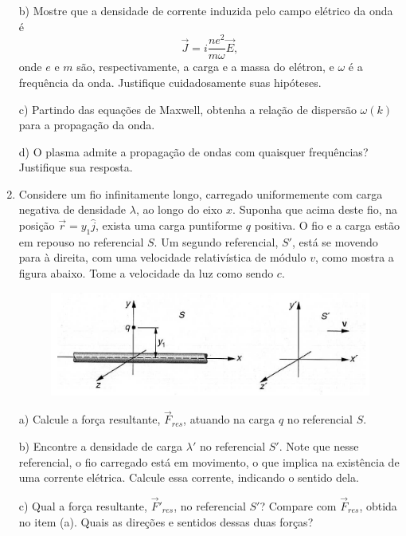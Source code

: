 \begin{enumerate}[start=1,label={\bfseries Q\arabic*.}]
b) Mostre que a densidade de corrente induzida pelo campo elétrico da onda é
$$
\vec{J} = i \frac{ne^{2}}{m \omega} \vec{E},
$$
onde $e$ e $m$ são, respectivamente, a carga e a massa do elétron, e $\omega$ é a frequência da onda. Justifique cuidadosamente suas hipóteses.

\resposta

c) Partindo das equações de Maxwell, obtenha a relação de dispersão $\omega(k)$ para a propagação da onda.

\resposta

d) O plasma admite a propagação de ondas com quaisquer frequências? Justifique sua resposta.

\resposta



\item Considere um fio infinitamente longo, carregado uniformemente com carga negativa de densidade $\lambda$, ao longo do eixo $x$. Suponha que acima deste fio, na posição $\vec{r} = y_{1} \hat{j}$, exista uma carga puntiforme $q$ positiva. O fio e a carga estão em repouso no referencial $S$. Um segundo referencial, $S'$, está se movendo para à direita, com uma velocidade relativística de módulo $v$, como mostra a figura abaixo. Tome a velocidade da luz como sendo $c$.
\begin{figure}[H]
\centering
\includegraphics[scale=0.8]{eletromag-img/fio2.png}
\end{figure}

a) Calcule a força resultante, $\vec{F}_{res}$, atuando na carga $q$ no referencial $S$.

\resposta

b) Encontre a densidade de carga $\lambda '$ no referencial $S'$. Note que nesse referencial, o fio carregado está em movimento, o que implica na existência de uma corrente elétrica. Calcule essa corrente, indicando o sentido dela.

\resposta

c) Qual a força resultante, $\vec{F}'_{res}$, no referencial $S'$? Compare com $\vec{F}_{res}$, obtida no item (a). Quais as direções e sentidos dessas duas forças?


\end{enumerate}
